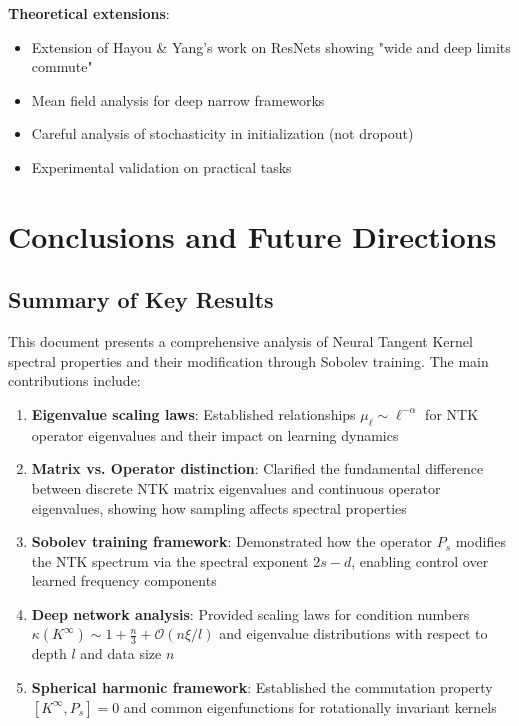 \documentclass{article}
\begin{document}
\textbf{Theoretical extensions}:
\begin{itemize}
\item Extension of Hayou \& Yang's work on ResNets showing "wide and deep limits commute"
\item Mean field analysis for deep narrow frameworks
\item Careful analysis of stochasticity in initialization (not dropout)
\item Experimental validation on practical tasks
\end{itemize}

\section{Conclusions and Future Directions}

\subsection{Summary of Key Results}

This document presents a comprehensive analysis of Neural Tangent Kernel spectral properties and their modification through Sobolev training. The main contributions include:

\begin{enumerate}
\item \textbf{Eigenvalue scaling laws}: Established relationships $\mu_\ell \sim \ell^{-\alpha}$ for NTK operator eigenvalues and their impact on learning dynamics

\item \textbf{Matrix vs. Operator distinction}: Clarified the fundamental difference between discrete NTK matrix eigenvalues and continuous operator eigenvalues, showing how sampling affects spectral properties

\item \textbf{Sobolev training framework}: Demonstrated how the operator $P_s$ modifies the NTK spectrum via the spectral exponent $2s-d$, enabling control over learned frequency components

\item \textbf{Deep network analysis}: Provided scaling laws for condition numbers $\kappa(K^{\infty}) \sim 1 + \frac{n}{3} + \mathcal{O}(n \xi / l)$ and eigenvalue distributions with respect to depth $l$ and data size $n$

\item \textbf{Spherical harmonic framework}: Established the commutation property $[K^{\infty}, P_s] = 0$ and common eigenfunctions for rotationally invariant kernels
\end{enumerate}
\end{document}
